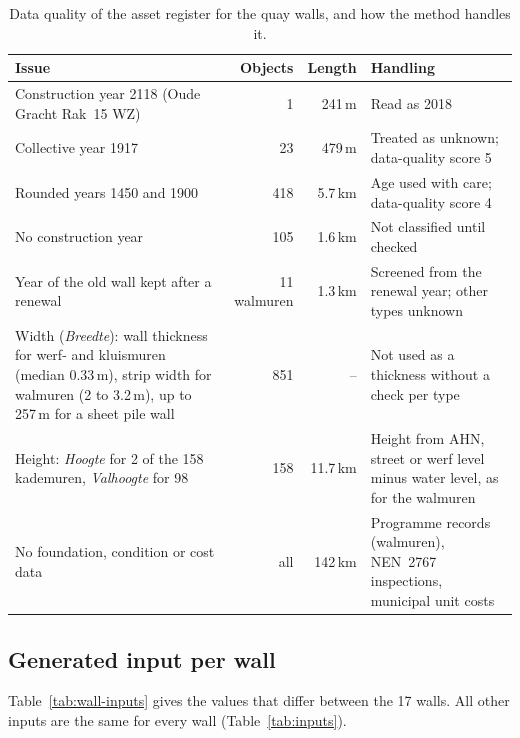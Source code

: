 \begin{table}[htbp]
\centering
\small
\caption{Data quality of the asset register for the quay walls, and how the
method handles it.}
\label{tab:data-quality}
\begin{tabularx}{\textwidth}{@{}>{\raggedright\arraybackslash}X r r
  >{\raggedright\arraybackslash}p{5.2cm}@{}}
\toprule
Issue & Objects & Length & Handling \\
\midrule
Construction year 2118 (Oude Gracht Rak~15 WZ) & 1 & 241\,m & Read as 2018 \\
Collective year 1917 & 23 & 479\,m & Treated as unknown; data-quality score 5 \\
Rounded years 1450 and 1900 & 418 & 5.7\,km & Age used with care; data-quality score 4 \\
No construction year & 105 & 1.6\,km & Not classified until checked \\
Year of the old wall kept after a renewal & 11 walmuren & 1.3\,km & Screened from the renewal year; other types unknown \\
Width (\emph{Breedte}): wall thickness for werf- and kluismuren (median 0.33\,m), strip width for walmuren (2 to 3.2\,m), up to 257\,m for a sheet pile wall & 851 & -- & Not used as a thickness without a check per type \\
Height: \emph{Hoogte} for 2 of the 158 kademuren, \emph{Valhoogte} for 98 & 158 & 11.7\,km & Height from AHN, street or werf level minus water level, as for the walmuren \\
No foundation, condition or cost data & all & 142\,km & Programme records (walmuren), NEN~2767 inspections, municipal unit costs \\
\bottomrule
\end{tabularx}
\end{table}

\subsection{Generated input per wall}\label{app:data-walls}

Table~\ref{tab:wall-inputs} gives the values that differ between the 17
walls. All other inputs are the same for every wall (Table~\ref{tab:inputs}).

